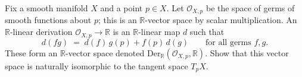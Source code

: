 \begin{problem}
\label{prob:cp-vii-0016}
\noindent Fix a smooth manifold $X$ and a point $p\in X$. Let $\mathcal{O}_{X,p}$ be the space of germs
of smooth functions about $p$; this is an $\mathbb{R}$-vector space by scalar multiplication.
An $\mathbb{R}$-linear derivation $\mathcal{O}_{X,p}\to\mathbb{R}$ is an $\mathbb{R}$-linear map $d$ such that
\[
d(fg)\;=\; d(f)\,g(p) + f(p)\,d(g)
\qquad\text{for all germs } f,g.
\]
These form an $\mathbb{R}$-vector space denoted $\mathrm{Der}_{\mathbb{R}}(\mathcal{O}_{X,p},\mathbb{R})$.
Show that this vector space is naturally isomorphic to the tangent space $T_pX$.




\end{problem}

